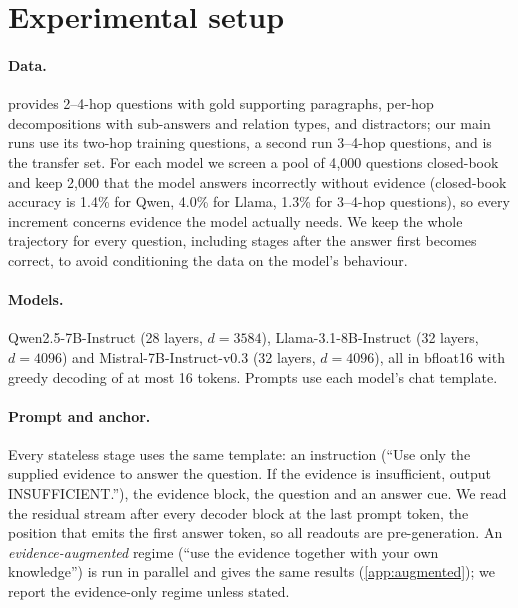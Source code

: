 \section{Experimental setup}
\label{sec:setup}

\paragraph{Data.}
\musique{} \citep{trivedi2022musique} provides 2--4-hop questions with gold supporting paragraphs, per-hop decompositions with sub-answers and relation types, and distractors; our main runs use its two-hop training questions, a second run 3--4-hop questions, and \twowiki{} \citep{ho2020constructing} is the transfer set. For each model we screen a pool of 4{,}000 questions closed-book and keep 2{,}000 that the model answers incorrectly without evidence (closed-book accuracy is 1.4\% for Qwen, 4.0\% for Llama, 1.3\% for 3--4-hop questions), so every increment concerns evidence the model actually needs. We keep the whole trajectory for every question, including stages after the answer first becomes correct, to avoid conditioning the data on the model's behaviour.

\paragraph{Models.}
Qwen2.5-7B-Instruct (28 layers, $d=3584$), Llama-3.1-8B-Instruct (32 layers, $d=4096$) and Mistral-7B-Instruct-v0.3 (32 layers, $d=4096$), all in bfloat16 with greedy decoding of at most 16 tokens. Prompts use each model's chat template.

\paragraph{Prompt and anchor.}
Every stateless stage uses the same template: an instruction (``Use only the supplied evidence to answer the question. If the evidence is insufficient, output INSUFFICIENT.''), the evidence block, the question and an answer cue. We read the residual stream after every decoder block at the last prompt token, the position that emits the first answer token, so all readouts are pre-generation. An \emph{evidence-augmented} regime (``use the evidence together with your own knowledge'') is run in parallel and gives the same results (\cref{app:augmented}); we report the evidence-only regime unless stated.


